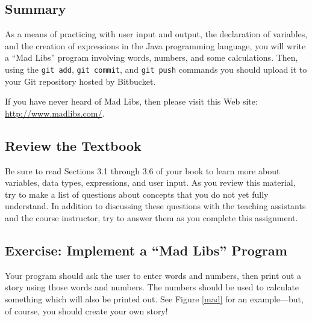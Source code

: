 



\vspace*{-.2in}
\subsection*{Summary}
\vspace*{-.05in}

As a means of practicing with user input and output, the declaration of variables, and the creation of expressions in
the Java programming language, you will write a ``Mad Libs'' program involving words, numbers, and some calculations.
Then, using the {\tt git add}, {\tt git commit}, and {\tt git push} commands you should upload it to your Git repository
hosted by Bitbucket.  

\noindent
If you have never heard of Mad Libs, then please visit this Web site: \url{http://www.madlibs.com/}. 

\vspace*{-.15in}
\subsection*{Review the Textbook}
\vspace*{-.05in}
Be sure to read Sections 3.1 through 3.6 of your book to learn more about variables, data types, expressions, and user
input.  As you review this material, try to make a list of questions about concepts that you do not yet fully
understand.  In addition to discussing these questions with the teaching assistants and the course instructor, try to
answer them as you complete this assignment.

\vspace*{-.15in}
\subsection*{Exercise: Implement a ``Mad Libs'' Program} 
\vspace*{-.05in}
Your program should ask the user to enter words and numbers, then print out a story using those words and numbers. The
numbers should be used to calculate something which will also be printed out. See Figure \ref{mad} for an example---but,
of course, you should create your own story!

